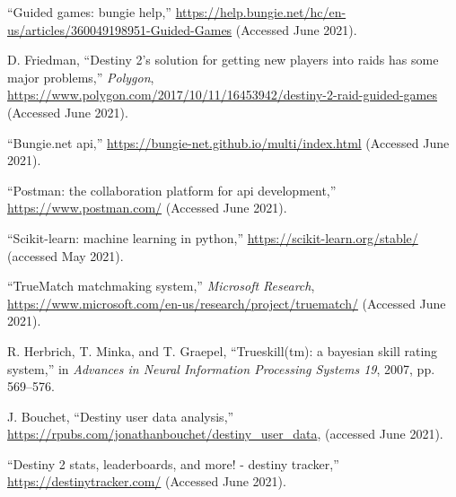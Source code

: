 \documentclass[conference]{IEEEtran}
\begin{document}

\begin{thebibliography}{00}
     ``Guided games: bungie help,''
    \url{https://help.bungie.net/hc/en-us/articles/360049198951-Guided-Games} (Accessed June 2021).

     D. Friedman, ``Destiny 2’s solution for getting new
    players into raids has some major problems,'' \textit{Polygon},
    \url{https://www.polygon.com/2017/10/11/16453942/destiny-2-raid-guided-games} (Accessed June 2021).

     ``Bungie.net api,'' \url{https://bungie-net.github.io/multi/index.html} (Accessed June 2021).

     ``Postman: the collaboration platform for api
    development,'' \url{https://www.postman.com/} (Accessed June 2021).

    ``Scikit-learn: machine learning in python,'' \url{https://scikit-learn.org/stable/} (accessed May 2021).

    ``TrueMatch matchmaking system,'' \textit{Microsoft Research},
    \url{https://www.microsoft.com/en-us/research/project/truematch/} (Accessed June 2021).

     R. Herbrich, T. Minka, and T. Graepel, ``Trueskill(tm):
    a bayesian skill rating system,'' in \textit{Advances in Neural Information Processing Systems 19}, 2007, pp. 569–576.

     J. Bouchet, ``Destiny user data analysis,''
    \url{https://rpubs.com/jonathanbouchet/destiny_user_data}, (accessed June 2021).

     ``Destiny 2 stats, leaderboards, and more! - destiny
    tracker,'' \url{https://destinytracker.com/} (Accessed June 2021).
\end{thebibliography}
\end{document}
